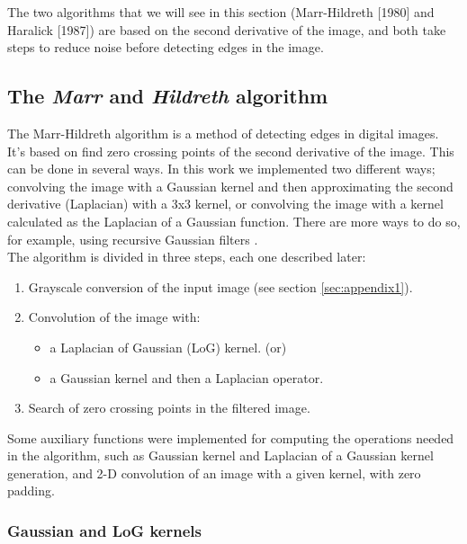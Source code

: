 \documentclass{ipol}
\numberwithin{equation}{section}
\numberwithin{table}{section}
\numberwithin{figure}{section}
\begin{document}
The two algorithms that we will see in this section (Marr-Hildreth \cite{AIM-518} [1980] and Haralick \cite{bb20239} [1987]) 
are based on the second derivative of the image, and both take steps to reduce noise before 
detecting edges in the image.\\

\subsection{The \textit{Marr} and \textit{Hildreth} algorithm}

The Marr-Hildreth algorithm is a method of detecting edges in digital 
images. It's based on find zero crossing points of the second derivative
of the image. This can be done in several ways. In this work we implemented 
two different ways; convolving the image with a Gaussian kernel and then 
approximating the second derivative (Laplacian) with a 3x3 kernel, or 
convolving the image with a kernel calculated as the Laplacian of a 
Gaussian function. There are more ways to do so, for example, using 
recursive Gaussian filters \cite{Deriche1993Recursively}.\\

The algorithm is divided in three steps, each one described later:
\begin{enumerate}
	\item Grayscale conversion of the input image (see section \ref{sec:appendix1}).
	\item Convolution of the image with:
	\begin{itemize}
		\item a Laplacian of Gaussian (LoG) kernel. (or)
		\item a Gaussian kernel and then a Laplacian operator.
	\end{itemize}
	\item Search of zero crossing points in the filtered image.\\
\end{enumerate}

Some auxiliary functions were implemented for computing the operations
needed in the algorithm, such as Gaussian kernel and Laplacian of a Gaussian 
kernel generation, and 2-D convolution of an image with a given kernel, 
with zero padding.\\



\subsubsection{Gaussian and LoG kernels}
\end{document}
